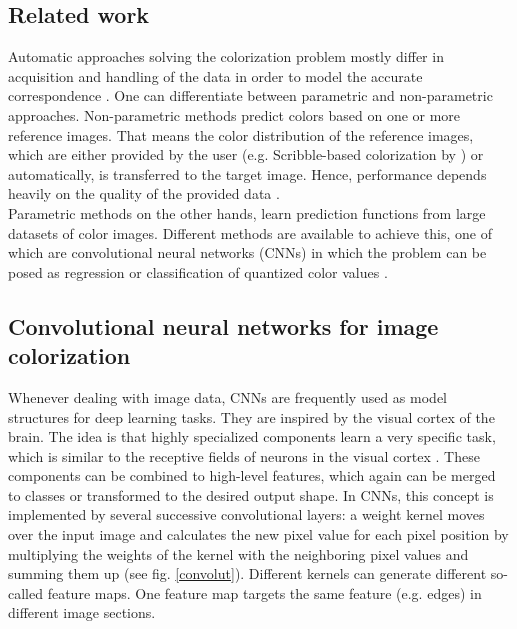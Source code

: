 \documentclass[12pt,letterpaper]{article}
\begin{document}
\subsection{Related work}
Automatic approaches solving the colorization problem mostly differ in acquisition and handling of the data in order to model the accurate correspondence \citep{Zhang.2016}. One can differentiate between parametric and non-parametric approaches. Non-parametric methods predict colors based on one or more reference images. That means the color distribution of the reference images, which are either provided by the user (e.g. Scribble-based colorization by \cite{Levin.2004}) or automatically, is transferred to the target image. Hence, performance depends heavily on the quality of the provided data \citep{Cheng_2015}.\\
Parametric methods on the other hands, learn prediction functions from large datasets of color images. Different methods are available to achieve this, one of which are convolutional neural networks (CNNs) in which the problem can be posed as regression or classification of quantized color values \citep{Zhang.2016}.

\subsection{Convolutional neural networks for image colorization}
Whenever dealing with image data, CNNs are frequently used as model structures for deep learning tasks. They are inspired by the visual cortex of the brain. The idea is that highly specialized components learn a very specific task, which is similar to the receptive fields of neurons in the visual cortex \citep{Hubel1962}. These components can be combined to high-level features, which again can be merged to classes or transformed to the desired output shape. In CNNs, this concept is implemented by several successive convolutional layers: a weight kernel moves over the input image and calculates the new pixel value for each pixel position by multiplying the weights of the kernel with the neighboring pixel values and summing them up (see fig. \ref{convolut}). Different kernels can generate different so-called feature maps. One feature map targets the same feature (e.g. edges) in different image sections.
\end{document}

